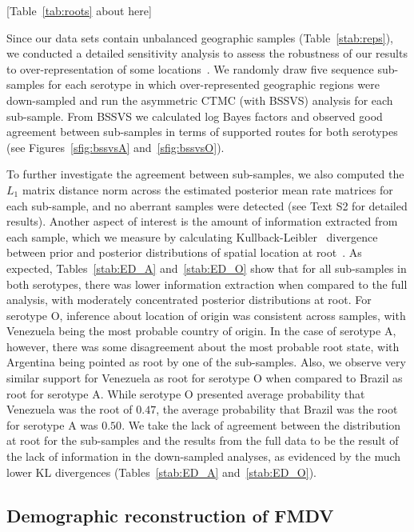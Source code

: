 \documentclass[10pt]{article}
\begin{document}
\begin{center}
 [Table~\ref{tab:roots} about here]
\end{center}

Since our data sets contain unbalanced geographic samples (Table~\ref{stab:reps}), we conducted a detailed sensitivity analysis to assess the robustness of our results to over-representation of some locations~\cite{Faria2012, fluPNAS, Bedford2010, polar}.
We randomly draw five sequence sub-samples for each serotype in which over-represented geographic regions were down-sampled and run the asymmetric CTMC (with BSSVS) analysis for each sub-sample.
From BSSVS we calculated log Bayes factors and observed good agreement between sub-samples in terms of supported routes for both serotypes (see Figures~\ref{sfig:bssvsA} and~\ref{sfig:bssvsO}).

To further investigate the agreement between sub-samples, we also computed the $L_1$ matrix distance norm across the estimated posterior mean rate matrices for each sub-sample, and no aberrant samples were detected (see Text S2 for detailed results).
Another aspect of interest is the amount of information extracted from each sample, which we measure by calculating Kullback-Leibler~\cite{KL} divergence between prior and posterior distributions of spatial location at root~\cite{roots}.
As expected, Tables~\ref{stab:ED_A} and~\ref{stab:ED_O} show that for all sub-samples in both serotypes, there was lower information extraction when compared to the full analysis, with moderately concentrated posterior distributions at root.
For serotype O, inference about location of origin was consistent across samples, with Venezuela being the most probable country of origin.
In the case of serotype A, however, there was some disagreement about the most probable root state, with Argentina being pointed as root by one of the sub-samples.
Also, we observe very similar support for Venezuela as root for serotype O when compared to Brazil as root for serotype A.
While serotype O presented average probability that Venezuela was the root of $0.47$, the average probability that Brazil was the root for serotype A was $0.50$.
We take the lack of agreement between the distribution at root for the sub-samples and the results from the full data to be the result of the lack of information in the down-sampled analyses, as evidenced by the much lower KL divergences (Tables~\ref{stab:ED_A} and~\ref{stab:ED_O}). 

\subsection*{Demographic reconstruction of FMDV}
\end{document}
